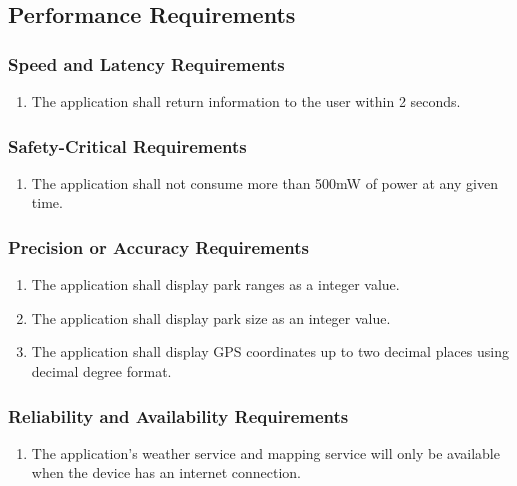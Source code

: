 \documentclass[titlepage]{article}
\begin{document}

\subsection{Performance Requirements}
\label{sub:performance_requirements}

\subsubsection{Speed and Latency Requirements}
\label{ssub:speed_and_latency_requirements}
\begin{enumerate}[{PR}1. ]
	\item The application shall return information to the user within 2 seconds. 
\end{enumerate}

\subsubsection{Safety-Critical Requirements}
\label{ssub:safety_critical_requirements}
\begin{enumerate}[{PR}1. ]
	\item The application shall not consume more than 500mW of power at any given time.   
\end{enumerate}

\subsubsection{Precision or Accuracy Requirements}
\label{ssub:precision_or_accuracy_requirements}
\begin{enumerate}[{PR}1. ]
	\item The application shall display park ranges as a integer value. 
	\item The application shall display park size as an integer value. 
	\item The application shall display GPS coordinates up to two decimal places using decimal degree format. 
	
\end{enumerate}

\subsubsection{Reliability and Availability Requirements}
\label{ssub:reliability_and_availability_requirements}
\begin{enumerate}[{PR}1. ]
	\item The application's weather service and mapping service will only be available when the device has an internet connection.
\end{enumerate}
\end{document}
